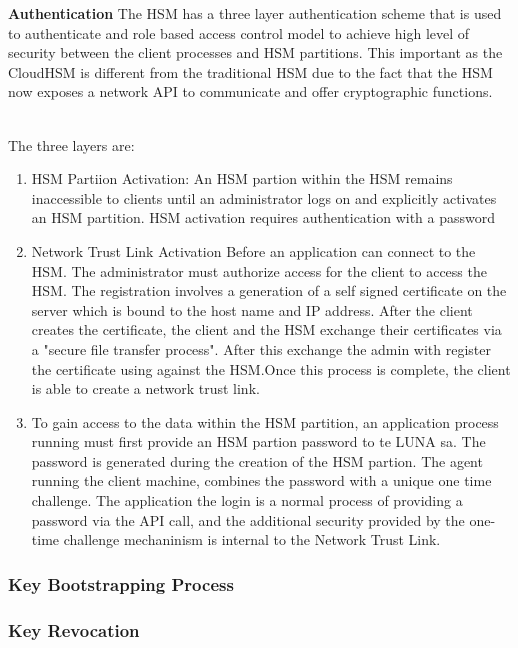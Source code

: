 			\textbf{Authentication}
				The HSM has a three layer authentication scheme that is used to authenticate and role based access control model to achieve high level of security between the client processes and HSM partitions. This important as the CloudHSM is different from the traditional HSM due to the fact that the HSM now exposes a network API to communicate and offer cryptographic functions. \\\


			The three layers are:

			\begin{enumerate}
				\item HSM Partiion Activation: An HSM partion within the HSM remains inaccessible to clients until an administrator logs on and explicitly activates an HSM partition. HSM activation requires authentication with a password

				\item Network Trust Link Activation
				Before an application can connect to the HSM. The administrator must authorize access for the client to access the HSM. The registration involves a generation of a self signed certificate on the server which is bound to the host name and IP address. After the client creates the certificate, the client and the HSM exchange their certificates via a {"secure file transfer process"}. After this exchange the admin with register the certificate using against the HSM.Once this process is complete, the client is able to create a network trust link. 

				\item To gain access to the data within the HSM partition, an application process running must first provide an HSM partion password to te LUNA sa. The password is generated during the creation of the HSM partion. The agent running the client machine, combines the password with a unique one time challenge.  The application the login is a normal process of providing a password via the API call, and the additional security provided by the one-time challenge mechaninism is internal to the Network Trust Link. 
			\end{enumerate}

			\subsubsection{Key Bootstrapping Process}

			\subsubsection{Key Revocation}

